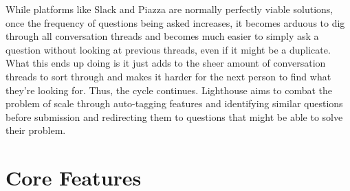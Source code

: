 \documentclass[preprint,11pt,3p]{article}
\begin{document}
While platforms like Slack and Piazza are normally perfectly viable solutions, once the frequency of questions being asked increases, it becomes arduous to dig through all conversation threads and becomes much easier to simply ask a question without looking at previous threads, even if it might be a duplicate. What this ends up doing is it just adds to the sheer amount of conversation threads to sort through and makes it harder for the next person to find what they’re looking for. Thus, the cycle continues. Lighthouse aims to combat the problem of scale through auto-tagging features and identifying similar questions before submission and redirecting them to questions that might be able to solve their problem. 

\newpage
\section{Core Features}
\end{document}

